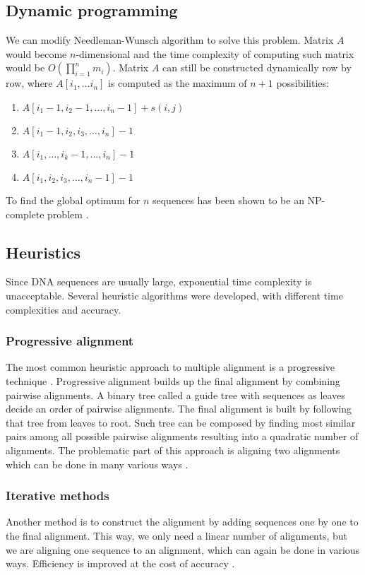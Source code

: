 \subsection{Dynamic programming}
We can modify Needleman-Wunsch algorithm to solve this problem.
Matrix $A$ would become $n$-dimensional and the time complexity of computing such matrix would be $O(\prod\limits_{i=1}^{n} m_{i})$.
Matrix $A$ can still be constructed dynamically row by row, where $A[i_1,...i_n]$ is computed as the maximum of $n+1$ possibilities:
\begin{enumerate}
\item $A[i_1-1,i_2-1, \dots, i_n-1]+s(i,j)$
\item $A[i_1-1, i_2, i_3, \dots, i_n]-1$
\renewcommand{\labelenumi}{\alph{enumi}+1.}
\setcounter{enumi}{10}
\item $A[i_1,\dots, i_k-1, \dots, i_n]-1$
\setcounter{enumi}{13}
\item $A[i_1, i_2, i_3, \dots, i_n-1]-1$
\end{enumerate}

To find the global optimum for $n$ sequences has been shown to be an NP-complete problem \cite{wang1994complexity}.

\subsection{Heuristics}
Since DNA sequences are usually large, exponential time complexity is unacceptable.
Several heuristic algorithms were developed, with different time complexities and accuracy.

\subsubsection{Progressive alignment}
The most common heuristic approach to multiple alignment is a progressive technique \cite{progressive}.
Progressive alignment builds up the final alignment by combining pairwise alignments.
A binary tree called a guide tree with sequences as leaves decide an order of pairwise alignments.
The final alignment is built by following that tree from leaves to root.
Such tree can be composed by finding most similar pairs among all possible pairwise alignments resulting into
a quadratic number of alignments.
The problematic part of this approach is aligning two alignments which can be done in many various ways \cite{baum}.

\subsubsection{Iterative methods}
Another method is to construct the alignment by adding sequences one by one to the final alignment.
This way, we only need a linear number of alignments, but we are aligning one sequence to an alignment, which can again be done in various ways.
Efficiency is improved at the cost of accuracy \cite{iterative}.